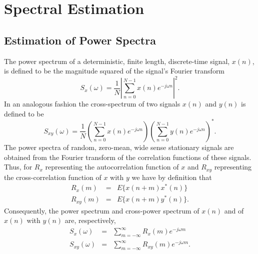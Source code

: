 
\chapter{Spectral Estimation}
\section{Estimation of Power Spectra}

	The power spectrum of a deterministic,
finite length, discrete-time signal, $x(n)$, is defined to
be the magnitude squared of the signal's Fourier transform
%
\begin{equation}
S_x(\omega)=\frac{1}{N}|\sum_{n=0}^{N-1}x(n)e^{-j\omega n}|^2.
\label{e.sp.1}
\end{equation}
%
In an analogous fashion the cross-spectrum of two signals 
$x(n)$ and $y(n)$ is defined to be
%
\begin{equation}
S_{xy}(\omega)=\frac{1}{N}(\sum_{n=0}^{N-1}x(n)e^{-j\omega n})(\sum_{n=0}^{N-1}y(n)e^{-j\omega n})^*.
\label{e.sp.2}
\end{equation}
%
The power spectra of random, zero-mean, wide sense stationary signals
are obtained from the Fourier transform of the correlation functions
of these signals.  Thus, for $R_x$ representing the autocorrelation
function of $x$ and $R_{xy}$ representing the cross-correlation function of
$x$ with $y$ we have by definition that
%
\begin{eqnarray}
R_x(m)&=&E\{x(n+m)x^*(n)\}\label{e.sp.3}\\
R_{xy}(m)&=&E\{x(n+m)y^*(n)\}.
\label{e.sp.4}
\end{eqnarray}
%
Consequently, the power spectrum and cross-power spectrum 
of $x(n)$ and of $x(n)$ with $y(n)$ are, respectively,
%
\begin{eqnarray}
S_x(\omega)&=&\sum_{m=-\infty}^{\infty}R_x(m)e^{-j\omega m}
\label{e.sp.5}\\
S_{xy}(\omega)&=&\sum_{m=-\infty}^{\infty}R_{xy}(m)e^{-j\omega m}.
\label{e.sp.6}
\end{eqnarray}
%

